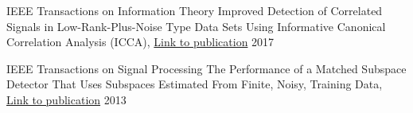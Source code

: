 

\begin{cvpubs}

  \cvpub
    {IEEE Transactions on Information Theory} %
    {Improved Detection of Correlated Signals in Low-Rank-Plus-Noise Type Data Sets Using
      Informative Canonical Correlation Analysis (ICCA), \href{https://ieeexplore.ieee.org/abstract/document/7903598}{\textcolor{awesome-red}{Link to
              publication}}} %
    {2017} %


  \cvpub
    {IEEE Transactions on Signal Processing} %
    {The Performance of a Matched Subspace Detector That Uses Subspaces Estimated From
      Finite, Noisy, Training Data, \href{https://ieeexplore.ieee.org/abstract/document/6415288}{\textcolor{awesome-red}{Link to
              publication}}} %
    {2013} %


\end{cvpubs}
